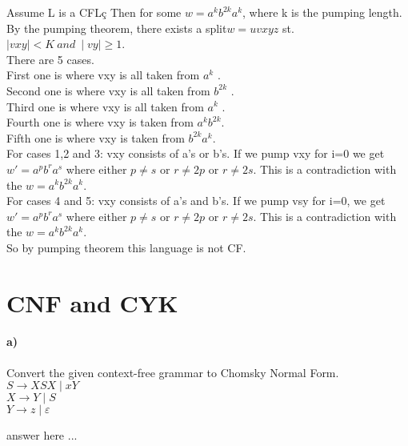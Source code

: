 \documentclass[a4paper,12pt]{article}
\begin{document}
\begin{tcolorbox}
Assume L is a CFLç Then for some $w=a^kb^{2k}a^k$, where k is the pumping length. By the pumping theorem, there exists a split$w=uvxyz$ st. $\mid vxy \mid < K \ and \ \mid vy \mid\geq 1$.\\
There are 5 cases.\\
First one is where vxy is all taken from $a^k$ .\\
Second one is where vxy is all taken from $b^{2k}$ .\\
Third one is where vxy is all taken from $a^{k}$ .\\
Fourth one is where vxy is taken from $a^kb^{2k}$.\\
Fifth one is where vxy is taken from $b^{2k}a^k$.\\
For cases 1,2 and 3: vxy consists of a's or b's. If we pump vxy for i=0 we get $w'=a^pb^ra^s$ where either $p \neq s$ or $r \neq 2p$ or $r \neq 2s$. This is a contradiction with the $w=a^kb^{2k}a^k$.\\
For cases 4 and 5: vxy consists of a's and b's. If we pump vsy for i=0, we get $w'=a^pb^ra^s$  where either $p \neq s$ or $r \neq 2p$ or $r \neq 2s$. This is a contradiction with the $w=a^kb^{2k}a^k$.\\
So by pumping theorem this language is not CF. 
\vspace{8cm} %
\end{tcolorbox}





\newpage
\section{CNF and CYK \hfill {}}

\paragraph{a)} Convert the given context-free grammar to Chomsky Normal Form. \\

$ S   \to XSX \mid xY $ \\
$ X   \to Y \mid S $ \\
$ Y   \to z \mid \varepsilon $ \\

\begin{tcolorbox}
answer here ...
\vspace{18cm} %
\end{tcolorbox}
\end{document}
